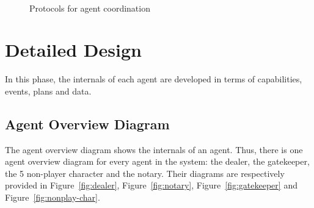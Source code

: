 \documentclass[a4paper]{article}
\begin{document}
\begin{figure}[htp]
  \\
  \label{fig:protocols}
  \caption{Protocols for agent coordination}
\end{figure}


\section{Detailed Design}\label{sec:detaildesign}

In this phase, the internals of each agent are developed in terms of capabilities, events, plans and data.

\subsection{Agent Overview Diagram}
The agent overview diagram shows the internals of an agent. Thus, there is one agent overview diagram for every agent in the system: the dealer, the gatekeeper, the 5 non-player character and the notary. Their diagrams are respectively provided in Figure~\ref{fig:dealer}, Figure~\ref{fig:notary}, Figure~\ref{fig:gatekeeper} and Figure~\ref{fig:nonplay-char}.
\end{document}
